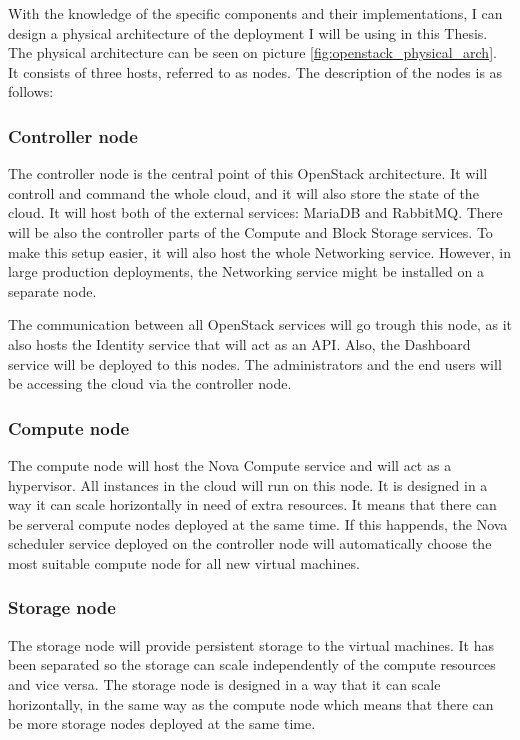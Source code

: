 With the knowledge of the specific components and their implementations, I can design a physical architecture of the deployment I will be using in this Thesis. The physical architecture can be seen on picture \ref{fig:openstack_physical_arch}. It consists of three hosts, referred to as nodes. The description of the nodes is as follows:

\subsubsection{Controller node}
The controller node is the central point of this OpenStack architecture. It will controll and command the whole cloud, and it will also store the state of the cloud. It will host both of the external services: MariaDB and RabbitMQ. There will be also the controller parts of the Compute and Block Storage services. To make this setup easier, it will also host the whole Networking service. However, in large production deployments, the Networking service might be installed on a separate node.

The communication between all OpenStack services will go trough this node, as it also hosts the Identity service that will act as an API. Also, the Dashboard service will be deployed to this nodes. The administrators and the end users will be accessing the cloud via the controller node.

\subsubsection{Compute node}

The compute node will host the Nova Compute service and will act as a hypervisor. All instances in the cloud will run on this node. It is designed in a way it can scale horizontally in need of extra resources. It means that there can be serveral compute nodes deployed at the same time. If this happends, the Nova scheduler service deployed on the controller node will automatically choose the most suitable compute node for all new virtual machines.

\subsubsection{Storage node}

The storage node will provide persistent storage to the virtual machines. It has been separated so the storage can scale independently of the compute resources and vice versa. The storage node is designed in a way that it can scale horizontally, in the same way as the compute node which means that there can be more storage nodes deployed at the same time.


